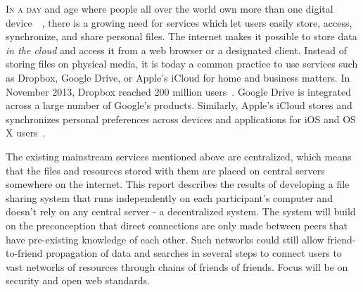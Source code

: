 \lettrine[lines=2, findent=2pt]{I}{n a day} and age where people all over the world own more than one digital device~\cite{OFCOMa:Online}~\cite{OFCOMb:Online}, there is a growing need for services which let users easily store, access, synchronize, and share personal files. The internet makes it possible to store data \emph{in the cloud} and access it from a web browser or a designated client. Instead of storing files on physical media, it is today a common practice to use services such as Dropbox, Google Drive, or Apple's iCloud for home and business matters. In November 2013, Dropbox reached 200 million users~\cite{Constine:2013:Online}. Google Drive is integrated across a large number of Google's products. Similarly, Apple's iCloud stores and synchronizes personal preferences across devices and applications for iOS and OS X users~\cite{CloudTrend:Online}.

The existing mainstream services mentioned above are centralized, which means that the files and resources stored with them are placed on central servers somewhere on the internet. This report describes the results of developing a file sharing system that runs independently on each participant's computer and doesn't rely on any central server - a decentralized system. The system will build on the preconception that direct connections are only made between peers that have pre-existing knowledge of each other. Such networks could still allow friend-to-friend propagation of data and searches in several steps to connect users to vast networks of resources through chains of friends of friends. Focus will be on security and open web standards.







